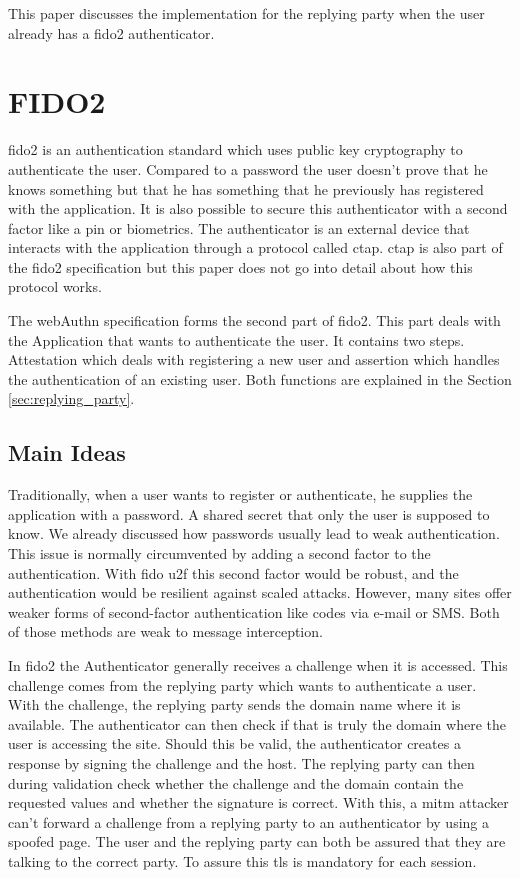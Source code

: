 \documentclass[a4paper, 11pt]{scrartcl}
\begin{document}
This paper discusses the implementation for the replying party when the user already has a \gls{fido2} authenticator.

\section{FIDO2}

\gls{fido2} is an authentication standard which uses public key cryptography to authenticate the user. Compared to a password the user doesn't prove that he knows something but that he has something that he previously has registered with the application. It is also possible to secure this authenticator with a second factor like a pin or biometrics. The authenticator is an external device that interacts with the application through a protocol called \gls{ctap}. \gls{ctap} is also part of the \gls{fido2} specification but this paper does not go into detail about how this protocol works. \cite{ctap}

The \gls{webAuthn} specification forms the second part of \gls{fido2}. This part deals with the Application that wants to authenticate the user. It contains two steps. Attestation which deals with registering a new user and assertion which handles the authentication of an existing user. Both functions are explained in the Section \ref{sec:replying_party}.

\subsection{Main Ideas}

Traditionally, when a user wants to register or authenticate, he supplies the application with a password. A shared secret that only the user is supposed to know. We already discussed how passwords usually lead to weak authentication. This issue is normally circumvented by adding a second factor to the authentication. With \gls{fido} \gls{u2f} this second factor would be robust, and the authentication would be resilient against scaled attacks. However, many sites offer weaker forms of second-factor authentication like codes via e-mail or SMS. Both of those methods are weak to message interception. \cite{smsweak}

In \gls{fido2} the Authenticator generally receives a challenge when it is accessed. This challenge comes from the replying party which wants to authenticate a user. With the challenge, the replying party sends the domain name where it is available. The authenticator can then check if that is truly the domain where the user is accessing the site. Should this be valid, the authenticator creates a response by signing the challenge and the host. The replying party can then during validation check whether the challenge and the domain contain the requested values and whether the signature is correct. With this, a \gls{mitm} attacker can't forward a challenge from a replying party to an authenticator by using a spoofed page. The user and the replying party can both be assured that they are talking to the correct party. To assure this \gls{tls} is mandatory for each session. \cite{yubico:whatIsFido2}
\end{document}
